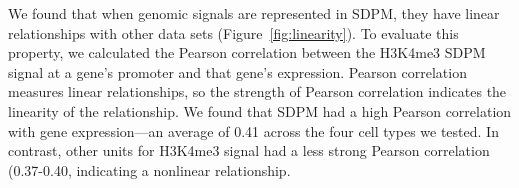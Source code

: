 \documentclass[11pt]{article}
\begin{document}
We found that when genomic signals are  represented in SDPM, they have linear relationships with other data sets (Figure~\ref{fig:linearity}). 
To evaluate this property, we calculated the Pearson correlation between the H3K4me3 SDPM signal at a gene's promoter and that gene's expression. 
Pearson correlation measures linear relationships, so the strength of Pearson correlation indicates the linearity of the relationship. 
We found that SDPM had a high Pearson correlation with gene expression---an average of 0.41  across the four cell types we tested.
In contrast, other units for H3K4me3 signal had a less strong Pearson correlation (0.37-0.40, indicating a nonlinear relationship. 


\end{document}
